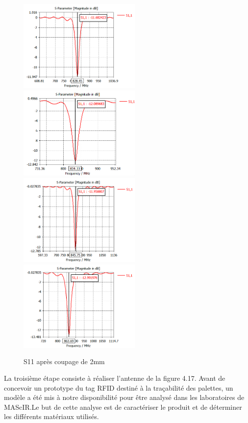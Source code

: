 \documentclass[11pt, a4paper, twoside]{book}
\begin{document}
\begin{figure}[H]
\centering
\includegraphics[width=6cm]{11}
\includegraphics[width=6cm]{22}\\
\includegraphics[width=6cm]{33}
\includegraphics[width=6cm]{44}
\caption{S11 après coupage de 2mm }
\end{figure}

La troisième étape  consiste à réaliser l'antenne de la figure 4.17. 
Avant de concevoir un prototype du tag RFID destiné à la traçabilité des palettes, un modèle a été mis à notre disponibilité pour être analysé dans les laboratoires de MAScIR.Le but de cette analyse est de caractériser le produit et de déterminer les différents matériaux utilisés.\\
\end{document}
